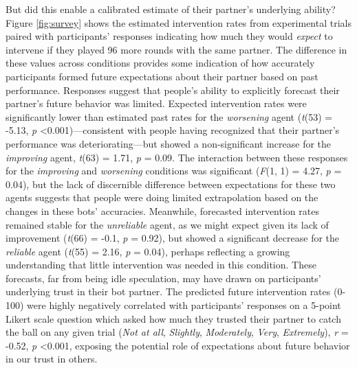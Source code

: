 \documentclass[10pt,letterpaper]{article}
\begin{document}
But did this enable a calibrated estimate of their partner's underlying ability? Figure \ref{fig:survey} shows the estimated intervention rates from experimental trials paired with participants' responses indicating how much they would \textit{expect} to intervene if they played 96 more rounds with the same partner. The difference in these values across conditions provides some indication of how accurately participants formed future expectations about their partner based on past performance. Responses suggest that people's ability to explicitly forecast their partner's future behavior was limited. Expected intervention rates were significantly lower than estimated past rates for the \textit{worsening} agent (\textit{t}(53) = -5.13, \textit{p} \textless{0.001})---consistent with people having recognized that their partner's performance was deteriorating---but showed a non-significant increase for the \textit{improving} agent, \textit{t}(63) = 1.71, \textit{p} = 0.09. The interaction between these responses for the \textit{improving} and \textit{worsening} conditions was significant (\textit{F}(1, 1) = 4.27, \textit{p} = 0.04), but the lack of discernible difference between expectations for these two agents suggests that people were doing limited extrapolation based on the changes in these bots' accuracies. Meanwhile, forecasted intervention rates remained stable for the \textit{unreliable} agent, as we might expect given its lack of improvement (\textit{t}(66) = -0.1, \textit{p} = 0.92), but showed a significant decrease for the \textit{reliable} agent (\textit{t}(55) = 2.16, \textit{p} = 0.04), perhaps reflecting a growing understanding that little intervention was needed in this condition. These forecasts, far from being idle speculation, may have drawn on participants' underlying trust in their bot partner. The predicted future intervention rates (0-100) were highly negatively correlated with participants' responses on a 5-point Likert scale question which asked how much they trusted their partner to catch the ball on any given trial (\textit{Not at all}, \textit{Slightly}, \textit{Moderately}, \textit{Very}, \textit{Extremely}), \textit{r} = -0.52, \textit{p} \textless{0.001}, exposing the potential role of expectations about future behavior in our trust in others.
\end{document}
